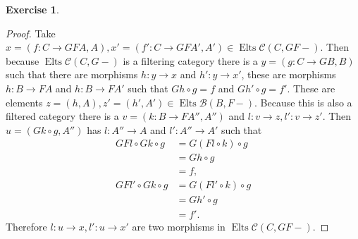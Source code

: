 \documentclass{article}
\DeclareMathOperator{\elements}{Elts}
\theoremstyle{definition}
\newtheorem{question}{Exercise}
\begin{document}
\begin{question}
\begin{enumerate}[(a)]
\begin{proof}
                  Take \(x=(f:C\to GFA,A),x'=(f':C\to
                  GFA',A')\in\elements\mathcal{C}(C,GF-)\). Then because
                  \(\elements\mathcal{C}(C,G-)\) is a filtering category there
                  is a \(y=(g:C\to GB,B)\) such that there are morphisms
                  \(h:y\to x\) and \(h':y\to x'\), these are morphisms \(h:B\to
                  FA\) and \(h:B\to FA'\) such that \(Gh\circ g=f\) and
                  \(Gh'\circ g=f'\). These are elements
                  \(z=(h,A),z'=(h',A')\in\elements\mathcal{B}(B,F-)\). Because
                  this is also a filtered category there is a \(v=(k:B\to
                  FA'',A'')\) and \(l:v\to z,l':v\to z'\). Then \(u=(Gk\circ
                  g,A'')\) has \(l:A''\to A\) and \(l':A''\to A'\) such that
                  \begin{align*}
                      GFl\circ Gk\circ g  & =G(Fl\circ k)\circ g  \\
                                          & =Gh\circ g            \\
                                          & =f,                   \\
                      GFl'\circ Gk\circ g & =G(Fl'\circ k)\circ g \\
                                          & =Gh'\circ g           \\
                                          & =f'.
                  \end{align*}
                  Therefore \(l:u\to x,l':u\to x'\) are two morphisms in
                  \(\elements\mathcal{C}(C,GF-)\).


\end{proof}
\end{enumerate}
\end{question}
\end{document}
